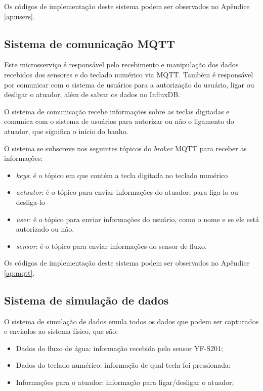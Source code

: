 Os códigos de implementação deste sistema podem ser observados no Apêndice \ref{ap:users}.

\subsection{Sistema de comunicação MQTT}

Este microsserviço é responsável pelo recebimento e manipulação dos dados recebidos dos sensores e do teclado numérico via MQTT. Também é responsável por comunicar com o sistema de usuários para a autorização do usuário, ligar ou desligar o atuador, além de salvar os dados no InfluxDB.

O sistema de comunicação recebe informações sobre as teclas digitadas e comunica com o sistema de usuários para autorizar ou não o ligamento do atuador, que significa o início do banho.

O sistema se subscreve nos seguintes tópicos do \textit{broker} MQTT para receber as informações:

\begin{itemize}
	\item \textit{keys}: é o tópico em que contém a tecla digitada no teclado numérico
	\item \textit{actuator}: é o tópico para enviar informações do atuador, para liga-lo ou desliga-lo
	\item \textit{user}: é o tópico para enviar informações do usuário, como o nome e se ele está autorizado ou não.
	\item \textit{sensor}: é o tópico para enviar informações do sensor de fluxo.
\end{itemize}

Os códigos de implementação deste sistema podem ser observados no Apêndice \ref{ap:mqtt}.

\subsection{Sistema de simulação de dados}

O sistema de simulação de dados emula todos os dados que podem ser capturados e enviados ao sistema físico, que são:

\begin{itemize}
	\item Dados do fluxo de água: informação recebida pelo sensor YF-S201;
	\item Dados do teclado numérico: informação de qual tecla foi pressionada;
	\item Informações para o atuador: informação para ligar/desligar o atuador;
\end{itemize}

